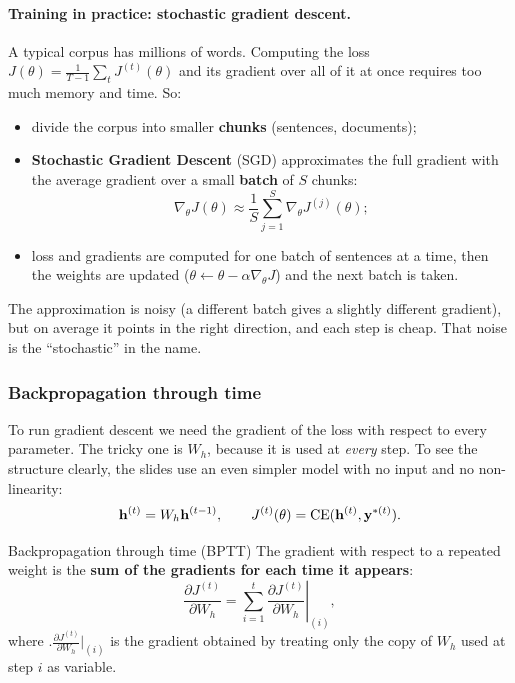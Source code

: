 \paragraph{Training in practice: stochastic gradient descent.}
A typical corpus has millions of words. Computing the loss
$J(\theta) = \frac{1}{T-1}\sum_{t} J^{(t)}(\theta)$ and its gradient over all of it at
once requires too much memory and time. So:
\begin{itemize}[nosep]
  \item divide the corpus into smaller \textbf{chunks} (sentences, documents);
  \item \textbf{Stochastic Gradient Descent} (SGD) approximates the full gradient with
        the average gradient over a small \textbf{batch} of $S$ chunks:
        \[
          \nabla_\theta J(\theta) \approx \frac1S \sum_{j=1}^{S} \nabla_\theta J^{(j)}(\theta) ;
        \]
  \item loss and gradients are computed for one batch of sentences at a time, then the
        weights are updated ($\theta \leftarrow \theta - \alpha \nabla_\theta J$) and the
        next batch is taken.
\end{itemize}
The approximation is noisy (a different batch gives a slightly different gradient),
but on average it points in the right direction, and each step is cheap. That noise is
the ``stochastic'' in the name.

\subsubsection{Backpropagation through time}

To run gradient descent we need the gradient of the loss with respect to every
parameter. The tricky one is $W_h$, because it is used at \emph{every} step. To see the
structure clearly, the slides use an even simpler model with no input and no
non-linearity:
\[
  \mathbf{h}^{(t)} = W_h \mathbf{h}^{(t-1)}, \qquad
  J^{(t)}(\theta) = \mathrm{CE}(\mathbf{h}^{(t)}, \mathbf{y}^{*(t)}) .
\]

\begin{nbfact}{Backpropagation through time (BPTT)}
The gradient with respect to a repeated weight is the \textbf{sum of the gradients for
each time it appears}:
\[
  \frac{\partial J^{(t)}}{\partial W_h} =
  \sum_{i=1}^{t} \left. \frac{\partial J^{(t)}}{\partial W_h} \right|_{(i)},
\]
where $\bigl.\frac{\partial J^{(t)}}{\partial W_h}\bigr|_{(i)}$ is the gradient obtained by
treating only the copy of $W_h$ used at step $i$ as variable.
\end{nbfact}

